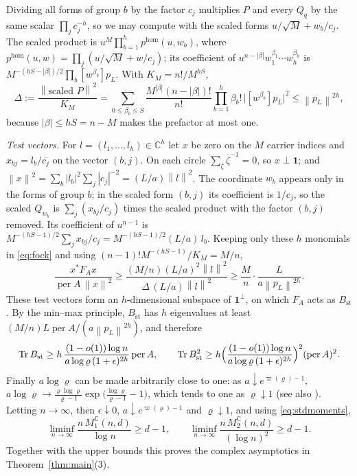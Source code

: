 \documentclass[11pt,a4paper]{article}
\theoremstyle{remark}
\newcommand{\per}{\operatorname{per}}
\newcommand{\Tr}{\operatorname{Tr}}
\newcommand{\norm}[1]{\left\lVert#1\right\rVert}
\newcommand{\one}{\mathbf 1}
\newcommand{\C}{\mathbb C}
\newcommand{\std}{\mathrm{st}}
\begin{document}
Dividing all forms of group $b$ by the factor $c_j$ multiplies $P$ and every $Q_q$ by the same scalar $\prod_jc_j^{-h}$, so we may compute with the scaled forms $u/\sqrt M+w_b/c_j$. The scaled product is $u^M\prod_{b=1}^hp^{\hom}(u,w_b)$, where $p^{\hom}(u,w)=\prod_j(u/\sqrt M+w/c_j)$; its coefficient of $u^{n-|\beta|}w_1^{\beta_1}\cdots w_h^{\beta_h}$ is $M^{-(hS-|\beta|)/2}\prod_b[w^{\beta_b}]p_L$. With $K_M=n!/M^{hS}$,
\[
 \Delta:=\frac{\norm{\text{scaled }P}^2}{K_M}=\sum_{0\le\beta_b\le S}\frac{M^{|\beta|}(n-|\beta|)!}{n!}\prod_{b=1}^h\beta_b!\,\bigl|[w^{\beta_b}]p_L\bigr|^2\le\norm{p_L}^{2h},
\]
because $|\beta|\le hS=n-M$ makes the prefactor at most one.

\emph{Test vectors.} For $l=(l_1,\dots,l_h)\in\C^h$ let $x$ be zero on the $M$ carrier indices and $x_{bj}=l_b/\overline{c_j}$ on the vector $(b,j)$. On each circle $\sum_\zeta\overline{\zeta}^{-1}=0$, so $x\perp\one$; and $\norm x^2=\sum_b|l_b|^2\sum_j|c_j|^{-2}=(L/a)\norm l^2$. The coordinate $w_b$ appears only in the forms of group $b$; in the scaled form $(b,j)$ its coefficient is $1/c_j$, so the scaled $Q_{w_b}$ is $\sum_j(x_{bj}/c_j)$ times the scaled product with the factor $(b,j)$ removed. Its coefficient of $u^{n-1}$ is $M^{-(hS-1)/2}\sum_jx_{bj}/c_j=M^{-(hS-1)/2}(L/a)\,l_b$. Keeping only these $h$ monomials in \eqref{eq:fock} and using $(n-1)!M^{-(hS-1)}/K_M=M/n$,
\[
 \frac{x^*F_Ax}{\per A\,\norm x^2}\ge\frac{(M/n)(L/a)^2\norm l^2}{\Delta\,(L/a)\norm l^2}\ge\frac Mn\cdot\frac{L}{a\norm{p_L}^{2h}} .
\]
These test vectors form an $h$-dimensional subspace of $\one^\perp$, on which $F_A$ acts as $B_\std$. By the min--max principle, $B_\std$ has $h$ eigenvalues at least $(M/n)L\per A/(a\norm{p_L}^{2h})$, and therefore
\[
 \Tr B_\std\ge h\,\frac{(1-o(1))\log n}{a\log\varrho\,(1+\epsilon)^{2h}}\per A,\qquad
 \Tr B_\std^2\ge h\Bigl(\frac{(1-o(1))\log n}{a\log\varrho\,(1+\epsilon)^{2h}}\Bigr)^2(\per A)^2 .
\]
Finally $a\log\varrho$ can be made arbitrarily close to one: as $a\downarrow e^{\varpi(\varrho)-1}$, $a\log\varrho\to\frac{\varrho\log\varrho}{\varrho-1}\exp\bigl(\frac{\log\varrho}{\varrho-1}-1\bigr)$, which tends to one as $\varrho\downarrow1$ (see also \cite[Section~6]{EPBS}). Letting $n\to\infty$, then $\epsilon\downarrow0$, $a\downarrow e^{\varpi(\varrho)-1}$ and $\varrho\downarrow1$, and using \eqref{eq:stdmoments},
\[
 \liminf_{n\to\infty}\frac{n\,M_1^\C(n,d)}{\log n}\ge d-1,\qquad
 \liminf_{n\to\infty}\frac{n\,M_2^\C(n,d)}{(\log n)^2}\ge d-1 .
\]
Together with the upper bounds this proves the complex asymptotics in Theorem~\ref{thm:main}(3).
\end{document}
